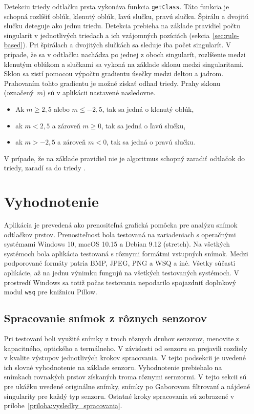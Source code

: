   Detekciu triedy odtlačku prsta vykonáva funkcia \texttt{getClass}. Táto funkcia je schopná rozlíšiť oblúk, klenutý oblúk, ľavú slučku, pravú slučku.
  Špirálu a dvojitú slučku deteguje ako jednu triedu. Detekcia prebieha na základe pravidiel počtu singularít v jednotlivých triedach a ich vzájomných
  pozíciách (sekcia~{\ref{sec:rule-based}}). Pri špirálach a dvojitých slučkách sa sleduje iba počet singularít. V prípade, že sa
  v odtlačku nachádza po jednej z oboch singularít, rozlíšenie medzi klenutým oblúkom a slučkami sa vykoná na základe sklonu medzi singularitami. Sklon sa
  zistí pomocou výpočtu gradientu úsečky medzi deltou a jadrom. Prahovaním tohto gradientu je možné získať odhad triedy. Prahy sklonu (označený~{$m$})
  sú v aplikácii nastavené nasledovne.
  \begin{itemize}
    \item Ak $m \geq 2,5$ alebo $m \leq -2,5$, tak sa jedná o klenutý oblúk,
    \item ak $m < 2,5$ a zároveň $m \geq 0$, tak sa jedná o ľavú slučku,
    \item ak $m > -2,5$ a zároveň $m < 0$, tak sa jedná o pravú slučku.
  \end{itemize}
  V prípade, že na základe pravidiel nie je algoritmus schopný zaradiť odtlačok do triedy, zaradí sa do triedy .

  \section{Vyhodnotenie}
  Aplikácia je prevedená ako prenositeľná grafická pomôcka pre analýzu snímok odtlačkov prstov. Prenositeľnosť bola testovaná na zariadeniach s operačnými
  systémami Windows 10, macOS 10.15 a Debian 9.12 (stretch). Na všetkých systémoch bola aplikácia testovaná s rôznymi formátmi vstupných snímok. Medzi
  podporované formáty patria BMP, JPEG, PNG a WSQ a iné. Všetky súčasti aplikácie, až na jednu výnimku fungujú na všetkých testovaných systémoch. V prostredí
  Windows sa totiž počas testovania nepodarilo spojazdniť doplnkový modul \texttt{wsq} pre knižnicu Pillow.

  \subsection{Spracovanie snímok z rôznych senzorov}
  Pri testovaní boli využité snímky z troch rôznych druhov senzorov, menovite z kapacitného, optického a termálneho. V závislosti od senzoru sa prejavili
  rozdiely v kvalite výstupov jednotlivých krokov spracovania. V tejto podsekcii je uvedené ich slovné vyhodnotenie na základe senzoru.
  Vyhodnotenie prebiehalo na snímkach rovnakých prstov získaných troma rôznymi sernzormi. V tejto sekcii sú pre ukážku uvedené originálne snímky,
  snímky po Gaborovom filtrovaní a nájdené singularity pre každý typ senzoru. Ostatné kroky spracovania sú zobrazené v
  prílohe~{\ref{priloha:vysledky_spracovania}}.

